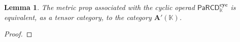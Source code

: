 \documentclass{amsart}
\newcommand{\bA}{\mathbf{A}}
\newcommand{\kk}{\mathbb{K}}    %
\newcommand{\PaRCD}{\mathsf{PaRCD}}
\newcommand{\RCD}{\mathsf{RCD}}
\newcommand{\hRCD}{{\RCD}_{\kk}}
\newcommand{\hPaRCD}{{\PaRCD}_{\kk}}
\newcommand{\cyc}{\mathbf{cyc}}
\newcommand{\Env}{\operatorname{Env}}
\newtheorem{lemma}[theorem]{Lemma}%
\theoremstyle{definition}
\numberwithin{equation}{section}
\begin{document}
\begin{lemma}\label{lemma: metric prop of PaRCD}
The metric prop associated with the cyclic operad $\hPaRCD^{\cyc}$ is equivalent, as a tensor category, to the category $\bA'(\kk)$.
\end{lemma}

\begin{proof}

\end{proof}
\end{document}
